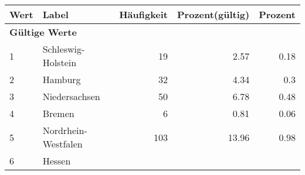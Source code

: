      \begin{longtable}{lXrrr}
     \toprule
     \textbf{Wert} & \textbf{Label} & \textbf{Häufigkeit} & \textbf{Prozent(gültig)} & \textbf{Prozent} \\
     \endhead
     \midrule
     \multicolumn{5}{l}{\textbf{Gültige Werte}}\\

     1 &
     \multicolumn{1}{X}{ Schleswig-Holstein   } &


       \num{19} &
       \num[round-mode=places,round-precision=2]{2,57} &
         \num[round-mode=places,round-precision=2]{0,18} \\

     2 &
     \multicolumn{1}{X}{ Hamburg   } &


       \num{32} &
       \num[round-mode=places,round-precision=2]{4,34} &
         \num[round-mode=places,round-precision=2]{0,3} \\

     3 &
     \multicolumn{1}{X}{ Niedersachsen   } &


       \num{50} &
       \num[round-mode=places,round-precision=2]{6,78} &
         \num[round-mode=places,round-precision=2]{0,48} \\

     4 &
     \multicolumn{1}{X}{ Bremen   } &


       \num{6} &
       \num[round-mode=places,round-precision=2]{0,81} &
         \num[round-mode=places,round-precision=2]{0,06} \\

     5 &
     \multicolumn{1}{X}{ Nordrhein-Westfalen   } &


       \num{103} &
       \num[round-mode=places,round-precision=2]{13,96} &
         \num[round-mode=places,round-precision=2]{0,98} \\

     6 &
     \multicolumn{1}{X}{ Hessen   } &



\end{longtable}
